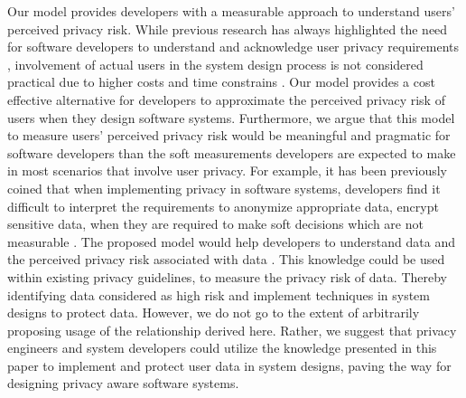 \documentclass[10pt]{article}
\begin{document}
Our model provides developers with a measurable approach to understand users' perceived privacy risk. While previous research has always highlighted the need for software developers to understand and acknowledge user privacy requirements \cite {senarath2018under, ayalon2018crowdsourcing}, involvement of actual users in the system design process is not considered practical due to higher costs and time constrains \cite {senarath2017designing}. Our model provides a cost effective alternative for developers to approximate the perceived privacy risk of users when they design software systems. Furthermore, we argue that this model to measure users' perceived privacy risk would be meaningful and pragmatic for software developers than the soft measurements developers are expected to make in most scenarios that involve user privacy. For example, it has been previously coined that when implementing privacy in software systems, developers find it difficult to interpret the requirements to anonymize appropriate data, encrypt sensitive data, when they are required to make soft decisions which are not measurable \cite {senarath2018why}. The proposed model would help developers to understand data and the perceived privacy risk associated with data  \cite {marr2015big}. This knowledge could be used within existing privacy guidelines, to measure the privacy risk of data. Thereby identifying data considered as high risk and implement techniques in system designs to protect data. However, we do not go to the extent of arbitrarily proposing usage of the relationship derived here. Rather, we suggest that privacy engineers and system developers could utilize the knowledge presented in this paper to implement and protect user data in system designs, paving the way for designing privacy aware software systems.
\end{document}
